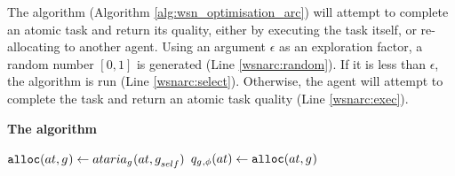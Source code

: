 The \acronymWSNOptimisationArc{}{} algorithm (Algorithm \ref{alg:wsn_optimisation_arc}) will attempt to complete an atomic task and return its quality, either by executing the task itself, or re-allocating to another agent. Using an argument $\epsilon$ as an exploration factor, a random number $[0,1]$ is generated (Line \ref{wsnarc:random}). If it is less than $\epsilon$, the \acronymATARIA{}{} algorithm is run (Line \ref{wsnarc:select}). Otherwise, the agent will attempt to complete the task and return an atomic task quality (Line \ref{wsnarc:exec}).
\begin{algorithm}[ht]
	\DontPrintSemicolon
	\footnotesize
	
	\caption{\textbf{The \acronymWSNOptimisationArc{}{} algorithm } }
	\label{alg:wsn_optimisation_arc}
	{
		\nonl \;

		{
			$\functionAlloc{}{} \leftarrow \functionATARIA{}{}$\label{wsnarc:select}\;	
			$\functionAtomicTaskQualitySignature{}{} \leftarrow \functionAlloc{}{}$ \label{wsnarc:alloc}\;
		}
	\Return{$\functionAtomicTaskQualitySignature{}{}$\label{wsnarc:return}} \;
	}
\end{algorithm}
